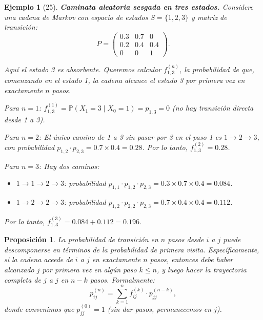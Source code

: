 \documentclass[12pt]{book}
\newtheorem{proposition}{Proposición}[chapter]
\newtheorem{example}{Ejemplo}[chapter]
\begin{document}
\begin{example}[25]
\textbf{Caminata aleatoria sesgada en tres estados.} Considere una cadena de Markov con espacio de estados $S = \{1, 2, 3\}$ y matriz de transición:
\[
P = \begin{pmatrix}
0.3 & 0.7 & 0 \\
0.2 & 0.4 & 0.4 \\
0 & 0 & 1
\end{pmatrix}.
\]

Aquí el estado 3 es absorbente. Queremos calcular $f_{1,3}^{(n)}$, la probabilidad de que, comenzando en el estado 1, la cadena alcance el estado 3 por primera vez en exactamente $n$ pasos.

Para $n = 1$: $f_{1,3}^{(1)} = \mathbb{P}(X_1 = 3 \mid X_0 = 1) = p_{1,3} = 0$ (no hay transición directa desde 1 a 3).

Para $n = 2$: El único camino de 1 a 3 sin pasar por 3 en el paso 1 es $1 \to 2 \to 3$, con probabilidad $p_{1,2} \cdot p_{2,3} = 0.7 \times 0.4 = 0.28$. Por lo tanto, $f_{1,3}^{(2)} = 0.28$.

Para $n = 3$: Hay dos caminos:
\begin{itemize}
    \item $1 \to 1 \to 2 \to 3$: probabilidad $p_{1,1} \cdot p_{1,2} \cdot p_{2,3} = 0.3 \times 0.7 \times 0.4 = 0.084$.
    \item $1 \to 2 \to 2 \to 3$: probabilidad $p_{1,2} \cdot p_{2,2} \cdot p_{2,3} = 0.7 \times 0.4 \times 0.4 = 0.112$.
\end{itemize}

Por lo tanto, $f_{1,3}^{(3)} = 0.084 + 0.112 = 0.196$.
\end{example}

\begin{proposition}
La probabilidad de transición en $n$ pasos desde $i$ a $j$ puede descomponerse en términos de la probabilidad de primera visita. Específicamente, si la cadena aceede de $i$ a $j$ en exactamente $n$ pasos, entonces debe haber alcanzado $j$ por primera vez en algún paso $k \leq n$, y luego hacer la trayectoria completa de $j$ a $j$ en $n - k$ pasos. Formalmente:
\[
p_{ij}^{(n)} = \sum_{k=1}^{n} f_{ij}^{(k)} \cdot p_{jj}^{(n-k)},
\]
donde convenimos que $p_{jj}^{(0)} = 1$ (sin dar pasos, permanecemos en $j$).
\end{proposition}
\end{document}
